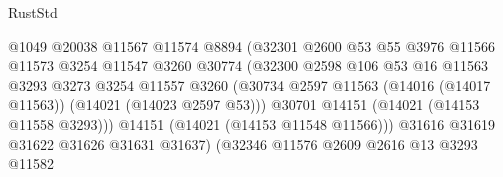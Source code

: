 \begin{lexlean}{RustStd}
\begin{coremodule}
                                          @1049
                                          @20038
                                          @11567
                                          @11574
                                          @8894
                                          (@32301
                                            @2600
                                            @53
                                            @55
                                            @3976
                                            @11566
                                            @11573
                                            @3254
                                            @11547
                                            @3260
                                            @30774
                                            (@32300
                                              @2598
                                              @106
                                              @53
                                              @16
                                              @11563
                                              @3293
                                              @3273
                                              @3254
                                              @11557
                                              @3260
                                              (@30734
                                                @2597
                                                @11563
                                                (@14016 (@14017 @11563))
                                                (@14021 (@14023 @2597 @53)))
                                              @30701
                                              @14151
                                              (@14021 (@14153 @11558 @3293)))
                                            @14151
                                            (@14021 (@14153 @11548 @11566)))
                                          @31616
                                          @31619
                                          @31622
                                          @31626
                                          @31631
                                          @31637)
                                        (@32346
                                          @11576
                                          @2609
                                          @2616
                                          @13
                                          @3293
                                          @11582

\end{coremodule}
\end{lexlean}
